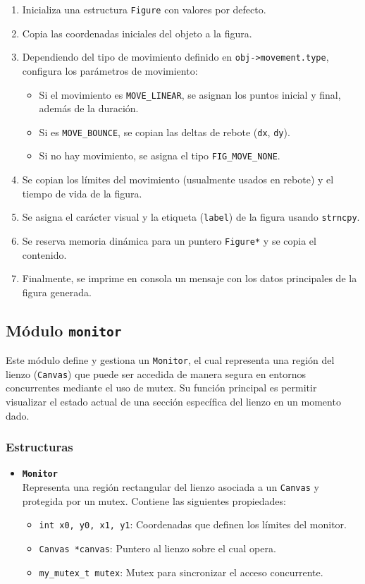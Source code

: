 \documentclass[12pt]{article}
\begin{document}
\begin{enumerate}
  \item Inicializa una estructura \texttt{Figure} con valores por defecto.
  \item Copia las coordenadas iniciales del objeto a la figura.
  \item Dependiendo del tipo de movimiento definido en \texttt{obj->movement.type}, configura los parámetros de movimiento:
  \begin{itemize}
    \item Si el movimiento es \texttt{MOVE\_LINEAR}, se asignan los puntos inicial y final, además de la duración.
    \item Si es \texttt{MOVE\_BOUNCE}, se copian las deltas de rebote (\texttt{dx}, \texttt{dy}).
    \item Si no hay movimiento, se asigna el tipo \texttt{FIG\_MOVE\_NONE}.
  \end{itemize}
  \item Se copian los límites del movimiento (usualmente usados en rebote) y el tiempo de vida de la figura.
  \item Se asigna el carácter visual y la etiqueta (\texttt{label}) de la figura usando \texttt{strncpy}.
  \item Se reserva memoria dinámica para un puntero \texttt{Figure*} y se copia el contenido.
  \item Finalmente, se imprime en consola un mensaje con los datos principales de la figura generada.
\end{enumerate}

\subsection{Módulo \texttt{monitor}}

Este módulo define y gestiona un \texttt{Monitor}, el cual representa una región del lienzo (\texttt{Canvas}) que puede ser accedida de manera segura en entornos concurrentes mediante el uso de mutex. Su función principal es permitir visualizar el estado actual de una sección específica del lienzo en un momento dado.



\subsubsection*{Estructuras}

\begin{itemize}
  \item \textbf{\texttt{Monitor}}\\
  Representa una región rectangular del lienzo asociada a un \texttt{Canvas} y protegida por un mutex. Contiene las siguientes propiedades:
  \begin{itemize}
    \item \texttt{int x0, y0, x1, y1}: Coordenadas que definen los límites del monitor.
    \item \texttt{Canvas *canvas}: Puntero al lienzo sobre el cual opera.
    \item \texttt{my\_mutex\_t mutex}: Mutex para sincronizar el acceso concurrente.
  \end{itemize}
\end{itemize}
\end{document}
